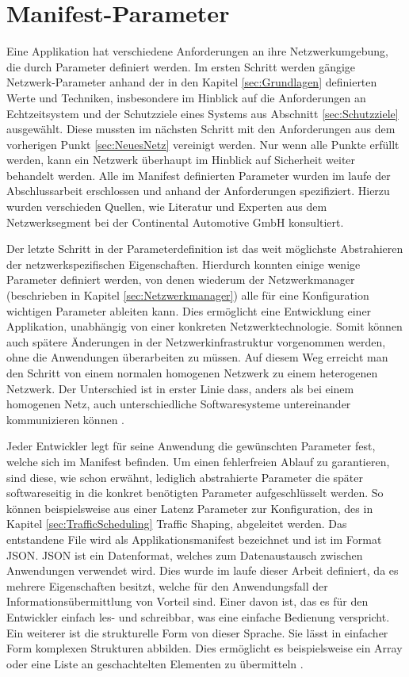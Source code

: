 \newpage  
\section{Manifest-Parameter}\label{sec:ManifestParam}
Eine Applikation hat verschiedene Anforderungen an ihre Netzwerkumgebung, die durch Parameter definiert werden. 
Im ersten Schritt werden gängige Netzwerk-Parameter anhand der in den Kapitel \ref{sec:Grundlagen} definierten Werte und Techniken, insbesondere im Hinblick auf die Anforderungen an Echtzeitsystem und der Schutzziele eines Systems aus Abschnitt \ref{sec:Schutzziele} ausgewählt. Diese mussten im nächsten Schritt mit den Anforderungen aus dem vorherigen Punkt \ref{sec:NeuesNetz} vereinigt werden. Nur wenn alle Punkte erfüllt werden, kann ein Netzwerk überhaupt im Hinblick auf Sicherheit weiter behandelt werden. Alle im Manifest definierten Parameter wurden im laufe der Abschlussarbeit erschlossen und anhand der Anforderungen spezifiziert. Hierzu wurden verschieden Quellen, wie Literatur und Experten aus dem Netzwerksegment bei der Continental Automotive GmbH konsultiert.

Der letzte Schritt in der Parameterdefinition ist das weit möglichste Abstrahieren der netzwerkspezifischen Eigenschaften. Hierdurch konnten einige wenige Parameter definiert werden, von denen wiederum der Netzwerkmanager (beschrieben in Kapitel \ref{sec:Netzwerkmanager})  alle für eine Konfiguration wichtigen Parameter ableiten kann. Dies ermöglicht eine Entwicklung einer Applikation, unabhängig von einer konkreten Netzwerktechnologie. Somit können auch spätere Änderungen in der Netzwerkinfrastruktur vorgenommen werden, ohne die Anwendungen überarbeiten zu müssen. Auf diesem Weg erreicht man den Schritt von einem normalen homogenen Netzwerk zu einem heterogenen Netzwerk. Der Unterschied ist in erster Linie dass, anders als bei einem homogenen Netz, auch unterschiedliche Softwaresysteme untereinander kommunizieren können \cite{HeterogenesNetzwerk}.

Jeder Entwickler legt für seine Anwendung die gewünschten Parameter fest, welche sich im Manifest befinden. Um einen fehlerfreien Ablauf zu garantieren, sind diese, wie schon erwähnt, lediglich abstrahierte Parameter die später softwareseitig in die konkret benötigten Parameter aufgeschlüsselt werden. So können beispielsweise aus einer Latenz Parameter zur Konfiguration, des in Kapitel \ref{sec:TrafficScheduling} Traffic Shaping, abgeleitet werden. Das entstandene File wird als Applikationsmanifest bezeichnet und ist im Format \acf{JSON}.  \acs{JSON} ist ein Datenformat, welches zum Datenaustausch zwischen Anwendungen verwendet wird. Dies wurde im laufe dieser Arbeit definiert, da es mehrere Eigenschaften besitzt, welche für den Anwendungsfall der Informationsübermittlung von Vorteil sind. Einer davon ist, das es für den Entwickler einfach les- und schreibbar, was eine einfache Bedienung verspricht. Ein weiterer ist die strukturelle Form von dieser Sprache. Sie lässt in einfacher Form komplexen Strukturen abbilden. Dies ermöglicht es beispielsweise ein Array oder eine Liste an geschachtelten Elementen zu übermitteln \cite{JSON}. 


